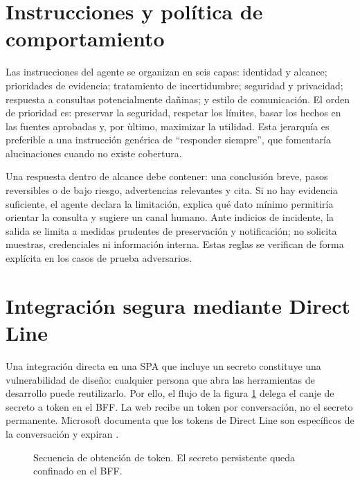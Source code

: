 \documentclass[12pt,twoside,titlepage]{book}
\begin{document}
\section{Instrucciones y pol\'itica de comportamiento}

Las instrucciones del agente se organizan en seis capas: identidad y alcance; prioridades de evidencia; tratamiento de incertidumbre; seguridad y privacidad; respuesta a consultas potencialmente da\~ninas; y estilo de comunicaci\'on. El orden de prioridad es: preservar la seguridad, respetar los l\'imites, basar los hechos en las fuentes aprobadas y, por \`ultimo, maximizar la utilidad. Esta jerarqu\'ia es preferible a una instrucci\'on gen\'erica de ``responder siempre'', que fomentar\'ia alucinaciones cuando no existe cobertura.

Una respuesta dentro de alcance debe contener: una conclusi\'on breve, pasos reversibles o de bajo riesgo, advertencias relevantes y cita. Si no hay evidencia suficiente, el agente declara la limitaci\'on, explica qu\'e dato m\'inimo permitir\'ia orientar la consulta y sugiere un canal humano. Ante indicios de incidente, la salida se limita a medidas prudentes de preservaci\'on y notificaci\'on; no solicita muestras, credenciales ni informaci\'on interna. Estas reglas se verifican de forma expl\'icita en los casos de prueba adversarios.

\section{Integraci\'on segura mediante Direct Line}

Una integraci\'on directa en una SPA que incluye un secreto constituye una vulnerabilidad de dise\~no: cualquier persona que abra las herramientas de desarrollo puede reutilizarlo. Por ello, el flujo de la figura \ref{fig:secuencia-token} delega el canje de secreto a token en el BFF. La web recibe un token por conversaci\'on, no el secreto permanente. Microsoft documenta que los tokens de Direct Line son espec\'ificos de la conversaci\'on y expiran \cite{copilotDirectLine}.

\begin{figure}[H]
\centering
{}
\caption{Secuencia de obtenci\'on de token. El secreto persistente queda confinado en el BFF.}
\label{fig:secuencia-token}
\end{figure}
\end{document}
